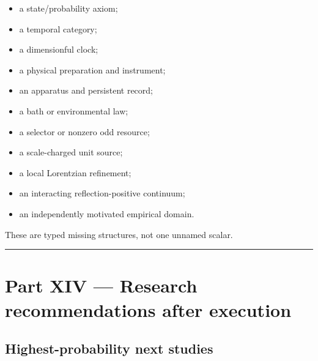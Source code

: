 \documentclass[11pt,a4paper,openany]{report}
\begin{document}
\begin{itemize}
\item 
a state/\allowbreak{}probability axiom;

\item 
a temporal category;

\item 
a dimensionful clock;

\item 
a physical preparation and instrument;

\item 
an apparatus and persistent record;

\item 
a bath or environmental law;

\item 
a selector or nonzero odd resource;

\item 
a scale-charged unit source;

\item 
a local Lorentzian refinement;

\item 
an interacting reflection-positive continuum;

\item 
an independently motivated empirical domain.

\end{itemize}

These are typed missing structures, not one unnamed scalar.

\par\medskip\hrule\medskip

\chapter{Part XIV — Research recommendations after execution}

\section{Highest-probability next studies}
\end{document}
